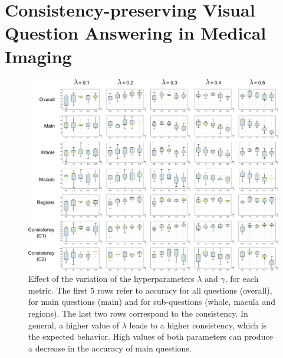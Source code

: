 \chapter{Consistency-preserving Visual Question Answering in Medical Imaging}
\label{appendix:consistency_mainsub}

\begin{figure}[!b]
\begin{center}
\includegraphics[width=\textwidth]{Figures/Part2_Consist/01_mainsub/boxplots.pdf}
\caption{Effect of the variation of the hyperparameters $\lambda$ and $\gamma$, for each metric. The first 5 rows refer to accuracy for all questions (overall), for main questions (main) and for sub-questions (whole, macula and regions). The last two rows correspond to the consistency. In general, a higher value of $\lambda$ leads to a higher consistency, which is the expected behavior. High values of both parameters can produce a decrease in the accuracy of main questions.}
\label{fig:supp_boxplots}
\end{center}
\end{figure}

